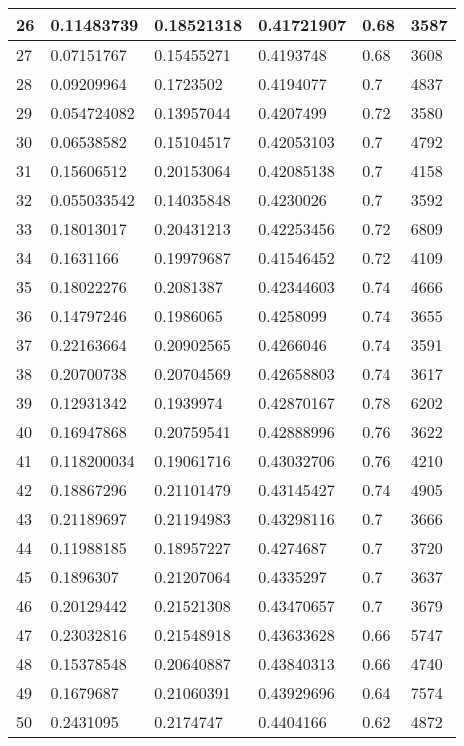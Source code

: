\begin{longtable}{|l|l|l|l|l|l|}
26 & 0.11483739 & 0.18521318 & 0.41721907 & 0.68 & 3587 \\ \hline 
27 & 0.07151767 & 0.15455271 & 0.4193748 & 0.68 & 3608 \\ \hline 
28 & 0.09209964 & 0.1723502 & 0.4194077 & 0.7 & 4837 \\ \hline 
29 & 0.054724082 & 0.13957044 & 0.4207499 & 0.72 & 3580 \\ \hline 
30 & 0.06538582 & 0.15104517 & 0.42053103 & 0.7 & 4792 \\ \hline 
31 & 0.15606512 & 0.20153064 & 0.42085138 & 0.7 & 4158 \\ \hline 
32 & 0.055033542 & 0.14035848 & 0.4230026 & 0.7 & 3592 \\ \hline 
33 & 0.18013017 & 0.20431213 & 0.42253456 & 0.72 & 6809 \\ \hline 
34 & 0.1631166 & 0.19979687 & 0.41546452 & 0.72 & 4109 \\ \hline 
35 & 0.18022276 & 0.2081387 & 0.42344603 & 0.74 & 4666 \\ \hline 
36 & 0.14797246 & 0.1986065 & 0.4258099 & 0.74 & 3655 \\ \hline 
37 & 0.22163664 & 0.20902565 & 0.4266046 & 0.74 & 3591 \\ \hline 
38 & 0.20700738 & 0.20704569 & 0.42658803 & 0.74 & 3617 \\ \hline 
39 & 0.12931342 & 0.1939974 & 0.42870167 & 0.78 & 6202 \\ \hline 
40 & 0.16947868 & 0.20759541 & 0.42888996 & 0.76 & 3622 \\ \hline 
41 & 0.118200034 & 0.19061716 & 0.43032706 & 0.76 & 4210 \\ \hline 
42 & 0.18867296 & 0.21101479 & 0.43145427 & 0.74 & 4905 \\ \hline 
43 & 0.21189697 & 0.21194983 & 0.43298116 & 0.7 & 3666 \\ \hline 
44 & 0.11988185 & 0.18957227 & 0.4274687 & 0.7 & 3720 \\ \hline 
45 & 0.1896307 & 0.21207064 & 0.4335297 & 0.7 & 3637 \\ \hline 
46 & 0.20129442 & 0.21521308 & 0.43470657 & 0.7 & 3679 \\ \hline 
47 & 0.23032816 & 0.21548918 & 0.43633628 & 0.66 & 5747 \\ \hline 
48 & 0.15378548 & 0.20640887 & 0.43840313 & 0.66 & 4740 \\ \hline 
49 & 0.1679687 & 0.21060391 & 0.43929696 & 0.64 & 7574 \\ \hline 
50 & 0.2431095 & 0.2174747 & 0.4404166 & 0.62 & 4872 \\ \hline 
\end{longtable}
